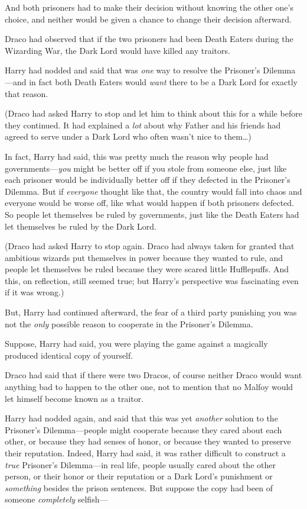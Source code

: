 And both prisoners had to make their decision without knowing the other one's 
choice, and neither would be given a chance to change their decision afterward.

Draco had observed that if the two prisoners had been Death Eaters during the 
Wizarding War, the Dark Lord would have killed any traitors.

Harry had nodded and said that was \emph{one} way to resolve the Prisoner's 
Dilemma---and in fact both Death Eaters would \emph{want} there to be a Dark 
Lord for exactly that reason.

(Draco had asked Harry to stop and let him to think about this for a while 
before they continued. It had explained a \emph{lot} about why Father and his 
friends had agreed to serve under a Dark Lord who often wasn't nice to 
them{\ldots})

In fact, Harry had said, this was pretty much the reason why people had 
governments---\emph{you} might be better off if you stole from someone else, 
just like each prisoner would be individually better off if they defected in 
the Prisoner's Dilemma. But if \emph{everyone} thought like that, the country 
would fall into chaos and everyone would be worse off, like what would happen 
if both prisoners defected. So people let themselves be ruled by governments, 
just like the Death Eaters had let themselves be ruled by the Dark Lord.

(Draco had asked Harry to stop again. Draco had always taken for granted that 
ambitious wizards put themselves in power because they wanted to rule, and 
people let themselves be ruled because they were scared little Hufflepuffs. And 
this, on reflection, still seemed true; but Harry's perspective was fascinating 
even if it was wrong.)

But, Harry had continued afterward, the fear of a third party punishing you was 
not the \emph{only} possible reason to cooperate in the Prisoner's Dilemma.

Suppose, Harry had said, you were playing the game against a magically produced 
identical copy of yourself.

Draco had said that if there were two Dracos, of course neither Draco would 
want anything bad to happen to the other one, not to mention that no Malfoy 
would let himself become known as a traitor.

Harry had nodded again, and said that this was yet \emph{another} solution to 
the Prisoner's Dilemma---people might cooperate because they cared about each 
other, or because they had senses of honor, or because they wanted to preserve 
their reputation. Indeed, Harry had said, it was rather difficult to construct 
a \emph{true} Prisoner's Dilemma---in real life, people usually cared about the 
other person, or their honor or their reputation or a Dark Lord's punishment or 
\emph{something} besides the prison sentences. But suppose the copy had been of 
someone \emph{completely} selfish---

